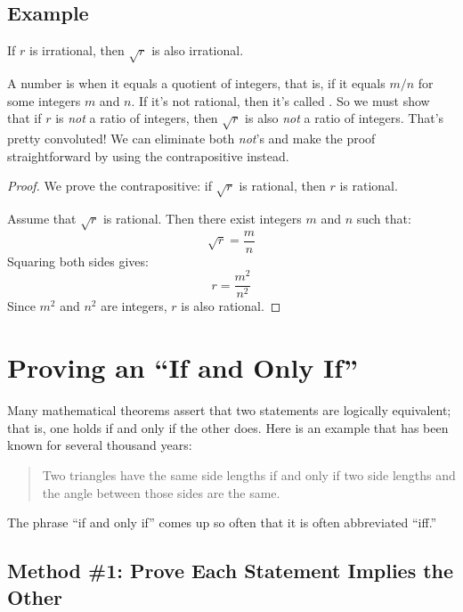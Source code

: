 \subsection*{Example}

\begin{theorem}
If $r$ is irrational, then $\sqrt{r}$ is also irrational.
\end{theorem}

A number is  when it equals a quotient of integers,
that is, if it equals $m/n$ for some integers $m$ and $n$.  If it's
not rational, then it's called .  So we must show
that if $r$ is \textit{not} a ratio of integers, then $\sqrt{r}$ is
also \textit{not} a ratio of integers.  That's pretty convoluted!  We
can eliminate both \emph{not}'s and make the proof straightforward by
using the contrapositive instead.

\begin{proof}
We prove the contrapositive: if $\sqrt{r}$ is rational, then $r$ is
rational.

Assume that $\sqrt{r}$ is rational.  Then there exist integers $m$ and $n$
such that:
%
\[
\sqrt{r} = \frac{m}{n}
\]
%
Squaring both sides gives:
%
\[
r  = \frac{m^2}{n^2}
\]
%
Since $m^2$ and $n^2$ are integers, $r$ is also rational.
\end{proof}

\begin{problems}
\homeworkproblems
{}
\end{problems}

\section{Proving an ``If and Only If''}
\label{sec:prove_iff}

Many mathematical theorems assert that two statements are logically
equivalent; that is, one holds if and only if the other does.  Here is an
example that has been known for several thousand years:
\begin{quote}
Two triangles have the same side lengths if and only if two
side lengths and the angle between those sides are the same.
\end{quote}

The phrase ``if and only if'' comes up so often that it is often
abbreviated ``iff.''

\subsection{Method \#1:  Prove Each Statement Implies the Other}

